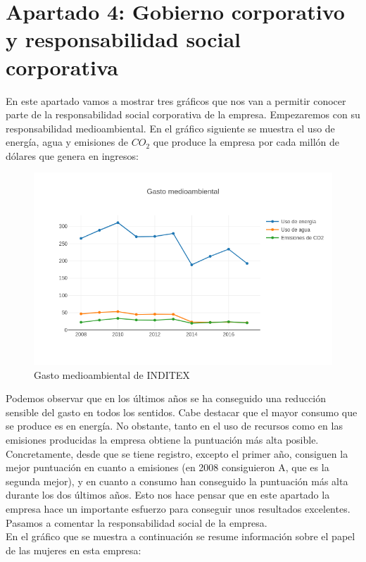 \documentclass[11pt]{article}
\theoremstyle{plain}
\theoremstyle{definition}
\begin{document}
\section*{Apartado 4: Gobierno corporativo y responsabilidad social
  corporativa}

En este apartado vamos a mostrar tres gráficos que nos van a permitir
conocer parte de la responsabilidad social corporativa de la
empresa. Empezaremos con su responsabilidad medioambiental. En el
gráfico siguiente se muestra el uso de energía, agua y emisiones de
$CO_2$ que produce la empresa por cada millón de dólares que genera en
ingresos:

\begin{figure}[H]
  \centering
  \includegraphics[width=\textwidth]{graphs/environment.png}
  \caption{Gasto medioambiental de INDITEX}
\end{figure}

Podemos observar que en los últimos años se ha conseguido una
reducción sensible del gasto en todos los sentidos. Cabe destacar que
el mayor consumo que se produce es en energía. No obstante, tanto en
el uso de recursos como en las emisiones producidas la empresa obtiene
la puntuación más alta posible. Concretamente, desde que se tiene
registro, excepto el primer año, consiguen la mejor puntuación en
cuanto a emisiones (en 2008 consiguieron A, que es la segunda mejor),
y en cuanto a consumo han conseguido la puntuación más alta durante
los dos últimos años. Esto nos hace pensar que en este apartado la
empresa hace un importante esfuerzo para conseguir unos resultados
excelentes. Pasamos a comentar la responsabilidad social de la empresa.\\

En el gráfico que se muestra a continuación se resume información
sobre el papel de las mujeres en esta empresa:
\end{document}
